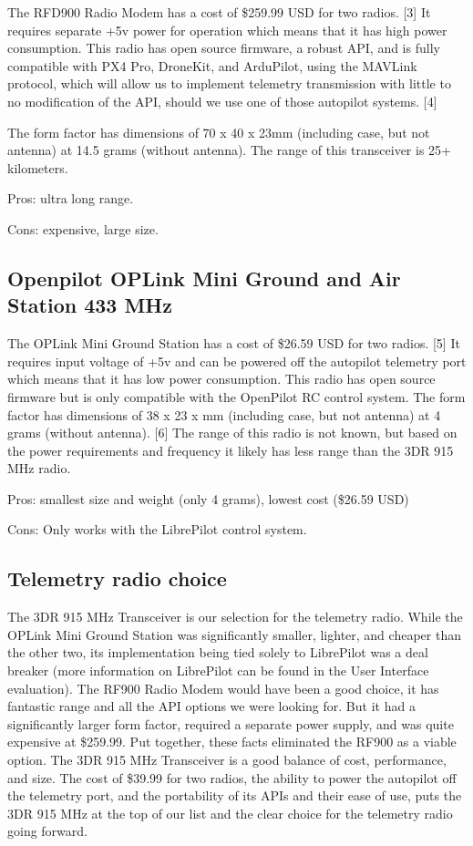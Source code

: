 \documentclass[compsoc,draftclsnofoot,onecolumn,10pt]{IEEEtran}
\begin{document}
The RFD900 Radio Modem has a cost of \$259.99 USD for two radios. [3] It requires
separate +5v power for operation which means that it has high power
consumption. This radio has open source firmware, a robust API, and is fully
compatible with PX4 Pro, DroneKit, and ArduPilot, using the MAVLink protocol,
which will allow us to implement telemetry transmission with little to no
modification of the API, should we use one of those autopilot systems. [4]

The form factor has dimensions of 70 x 40 x 23mm (including case, but not
antenna) at 14.5 grams (without
antenna).
The range of this transceiver is 25+ kilometers.

Pros: ultra long range.

Cons: expensive, large size.


\subsection{Openpilot OPLink Mini Ground and Air Station 433 MHz}

The OPLink Mini Ground Station has a cost of \$26.59 USD for two radios. [5] It
requires input voltage of +5v and can be powered off the autopilot telemetry
port which means that it has low power consumption. This radio has open source
firmware but is only compatible with the OpenPilot RC control system. 
The form factor has dimensions of 38 x 23 x mm (including case, but not
antenna) at 4 grams (without antenna). [6]
The range of this radio is not known, but based on the power requirements and
frequency it likely has less range than the 3DR 915 MHz radio.

Pros: smallest size and weight (only 4 grams), lowest cost (\$26.59 USD)

Cons: Only works with the LibrePilot control system.


\subsection{Telemetry radio choice}
The 3DR 915 MHz Transceiver is our selection for the telemetry radio.
While the OPLink Mini Ground Station was significantly smaller, lighter, and
cheaper than the other two, its implementation being tied solely to LibrePilot
was a deal breaker (more information on LibrePilot can be found in the User
Interface evaluation).
The RF900 Radio Modem would have been a good choice, it has fantastic range
and all the API options we were looking for. But it had a significantly larger
form factor, required a separate power supply, and was quite expensive at
\$259.99. Put together, these facts eliminated the RF900 as a viable option.
The 3DR 915 MHz Transceiver is a good balance of cost, performance, and size. The
cost of \$39.99 for two radios, the ability to power the autopilot off the
telemetry port, and the portability of its APIs and their ease of use, puts the
3DR 915 MHz at the top of our list and the clear choice for the telemetry
radio going forward.
\end{document}
